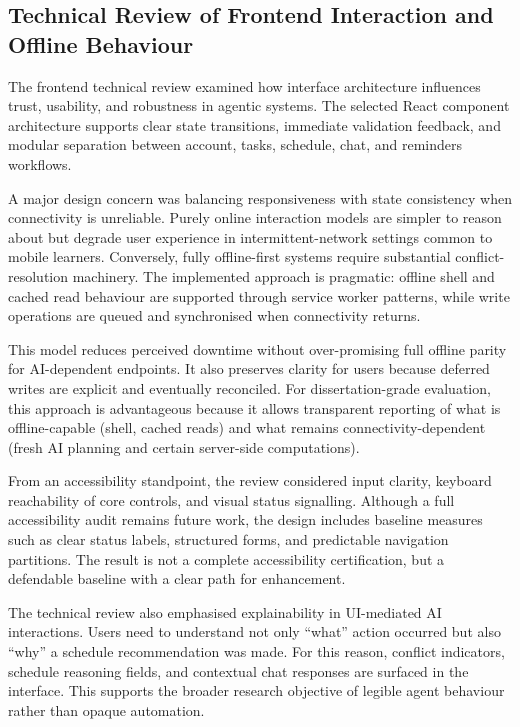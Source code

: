 \documentclass[12pt]{article}
\begin{document}
\subsection{Technical Review of Frontend Interaction and Offline Behaviour}
The frontend technical review examined how interface architecture influences trust, usability, and robustness in agentic systems. The selected React component architecture supports clear state transitions, immediate validation feedback, and modular separation between account, tasks, schedule, chat, and reminders workflows.

A major design concern was balancing responsiveness with state consistency when connectivity is unreliable. Purely online interaction models are simpler to reason about but degrade user experience in intermittent-network settings common to mobile learners. Conversely, fully offline-first systems require substantial conflict-resolution machinery. The implemented approach is pragmatic: offline shell and cached read behaviour are supported through service worker patterns, while write operations are queued and synchronised when connectivity returns.

This model reduces perceived downtime without over-promising full offline parity for AI-dependent endpoints. It also preserves clarity for users because deferred writes are explicit and eventually reconciled. For dissertation-grade evaluation, this approach is advantageous because it allows transparent reporting of what is offline-capable (shell, cached reads) and what remains connectivity-dependent (fresh AI planning and certain server-side computations).

From an accessibility standpoint, the review considered input clarity, keyboard reachability of core controls, and visual status signalling. Although a full accessibility audit remains future work, the design includes baseline measures such as clear status labels, structured forms, and predictable navigation partitions. The result is not a complete accessibility certification, but a defendable baseline with a clear path for enhancement.

The technical review also emphasised explainability in UI-mediated AI interactions. Users need to understand not only ``what'' action occurred but also ``why'' a schedule recommendation was made. For this reason, conflict indicators, schedule reasoning fields, and contextual chat responses are surfaced in the interface. This supports the broader research objective of legible agent behaviour rather than opaque automation.
\end{document}

